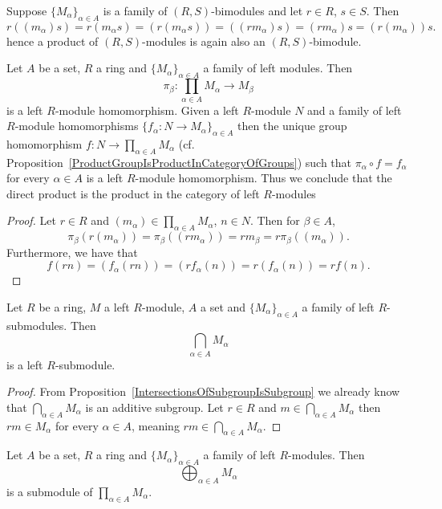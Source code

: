 \begin{remark}
     Suppose $\{M_\alpha\}_{\alpha\in A}$ is a family of $(R,S)$-bimodules and let $r\in R$, $s\in S$. Then 
    $$r((m_\alpha)s)= r(m_\alpha s) = (r(m_\alpha s))=((rm_\alpha)s) = (rm_\alpha)s=(r(m_\alpha))s.$$
    hence a product of $(R,S)$-modules is again also an $(R,S)$-bimodule.
\end{remark}
\begin{proposition}
    Let $A$ be a set, $R$ a ring and $\{M_\alpha\}_{\alpha \in A}$ a family of left modules. Then 
    $$\pi_\beta : \prod_{\alpha\in A} M_\alpha \rightarrow M_\beta$$
    is a left $R$-module homomorphism. Given a left $R$-module $N$ and a family of left $R$-module homomorphisms $\{f_\alpha : N \rightarrow M_\alpha\}_{\alpha\in A}$ then the unique group homomorphism $f: N\rightarrow \prod_{\alpha\in A} M_\alpha$ (cf.  Proposition~\ref{ProductGroupIsProductInCategoryOfGroups}) such that $\pi_\alpha \circ f = f_\alpha$ for every $\alpha \in A$ is a left $R$-module homomorphism. Thus we conclude that the direct product is the product in the category of left $R$-modules 
\end{proposition}
\begin{proof}
    Let $r\in R$ and $(m_\alpha)\in \prod_{\alpha \in A} M_\alpha$, $n\in N$. Then for $\beta \in A$, 
    $$\pi_\beta(r(m_\alpha))= \pi_\beta((rm_\alpha)) = rm_\beta = r \pi_\beta((m_\alpha)).$$
    Furthermore, we have that 
    $$f(rn)=(f_\alpha(rn))=(rf_\alpha(n))=r(f_\alpha(n))=rf(n).$$
\end{proof}
\begin{lemma}
    Let $R$ be a ring, $M$ a left $R$-module, $A$ a set and $\{M_\alpha\}_{\alpha\in A}$ a family of left $R$-submodules. Then 
    $$\bigcap_{\alpha\in A} M_\alpha$$
    is a left $R$-submodule.
\end{lemma}
\begin{proof}
    From Proposition~\ref{IntersectionsOfSubgroupIsSubgroup} we already know that $\bigcap_{\alpha\in A} M_\alpha$ is an additive subgroup. Let $r\in R$ and $m\in \bigcap_{\alpha\in A} M_\alpha$ then $rm\in M_\alpha$ for every $\alpha \in A$, meaning $rm \in \bigcap_{\alpha \in A} M_\alpha$.
\end{proof}
\begin{proposition}
    Let $A$ be a set, $R$ a ring and $\{M_\alpha\}_{\alpha \in A}$ a family of left $R$-modules. 
    Then
    $$\bigoplus_{\alpha\in A} M_\alpha$$
    is a submodule of $\prod_{\alpha\in A} M_\alpha$.
\end{proposition}
